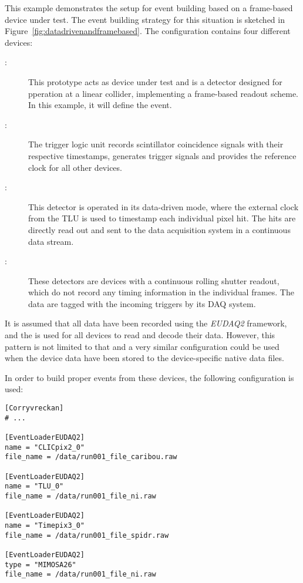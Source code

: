This example demonstrates the setup for event building based on a frame-based device under test.
The event building strategy for this situation is sketched in Figure~\ref{fig:datadrivenandframebased}.
The configuration contains four different devices:
\begin{description}
        \item[:] This prototype acts as device under test and is a detector designed for pperation at a linear collider, implementing a frame-based readout scheme. In this example, it will define the event.
        \item[:] The trigger logic unit records scintillator coincidence signals with their respective timestamps, generates trigger signals and provides the reference clock for all other devices.
        \item[:] This detector is operated in its data-driven mode, where the external clock from the TLU is used to timestamp each individual pixel hit. The hits are directly read out and sent to the data acquisition system in a continuous data stream.
        \item[:] These detectors are devices with a continuous rolling shutter readout, which do not record any timing information in the individual frames. The data are tagged with the incoming triggers by its DAQ system.
\end{description}

It is assumed that all data have been recorded using the \emph{EUDAQ2} framework, and the  is used for all devices to read and decode their data.
However, this pattern is not limited to that and a very similar configuration could be used when the device data have been stored to the device-specific native data files.

In order to build proper events from these devices, the following configuration is used:

\begin{verbatim}
[Corryvreckan]
# ...

[EventLoaderEUDAQ2]
name = "CLICpix2_0"
file_name = /data/run001_file_caribou.raw

[EventLoaderEUDAQ2]
name = "TLU_0"
file_name = /data/run001_file_ni.raw

[EventLoaderEUDAQ2]
name = "Timepix3_0"
file_name = /data/run001_file_spidr.raw

[EventLoaderEUDAQ2]
type = "MIMOSA26"
file_name = /data/run001_file_ni.raw
\end{verbatim}

